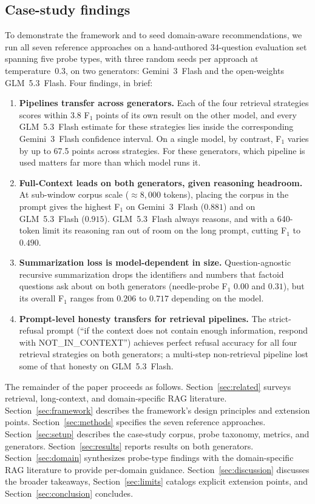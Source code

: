 \documentclass[conference,a4paper,10pt]{IEEEtran}
\begin{document}
\subsection{Case-study findings}

To demonstrate the framework and to seed domain-aware recommendations, we run all seven reference approaches on a hand-authored 34-question evaluation set spanning five probe types, with three random seeds per approach at temperature~$0.3$, on two generators: Gemini~3~Flash and the open-weights GLM~5.3~Flash.
Four findings, in brief:

\begin{enumerate}
    \item \textbf{Pipelines transfer across generators.} Each of the four retrieval strategies scores within 3.8 F$_1$ points of its own result on the other model, and every GLM~5.3~Flash estimate for these strategies lies inside the corresponding Gemini~3~Flash confidence interval. On a single model, by contrast, F$_1$ varies by up to 67.5 points across strategies. For these generators, which pipeline is used matters far more than which model runs it.
    \item \textbf{Full-Context leads on both generators, given reasoning headroom.} At sub-window corpus scale ($\approx 8{,}000$ tokens), placing the corpus in the prompt gives the highest F$_1$ on Gemini~3~Flash ($0.881$) and on GLM~5.3~Flash ($0.915$). GLM~5.3~Flash always reasons, and with a 640-token limit its reasoning ran out of room on the long prompt, cutting F$_1$ to $0.490$.
    \item \textbf{Summarization loss is model-dependent in size.} Question-agnostic recursive summarization drops the identifiers and numbers that factoid questions ask about on both generators (needle-probe F$_1$ $0.00$ and $0.31$), but its overall F$_1$ ranges from $0.206$ to $0.717$ depending on the model.
    \item \textbf{Prompt-level honesty transfers for retrieval pipelines.} The strict-refusal prompt (``if the context does not contain enough information, respond with NOT\_IN\_CONTEXT'') achieves perfect refusal accuracy for all four retrieval strategies on both generators; a multi-step non-retrieval pipeline lost some of that honesty on GLM~5.3~Flash.
\end{enumerate}

The remainder of the paper proceeds as follows.
Section~\ref{sec:related} surveys retrieval, long-context, and domain-specific RAG literature.
Section~\ref{sec:framework} describes the framework's design principles and extension points.
Section~\ref{sec:methods} specifies the seven reference approaches.
Section~\ref{sec:setup} describes the case-study corpus, probe taxonomy, metrics, and generators.
Section~\ref{sec:results} reports results on both generators.
Section~\ref{sec:domain} synthesizes probe-type findings with the domain-specific RAG literature to provide per-domain guidance.
Section~\ref{sec:discussion} discusses the broader takeaways, Section~\ref{sec:limits} catalogs explicit extension points, and Section~\ref{sec:conclusion} concludes.
\end{document}
